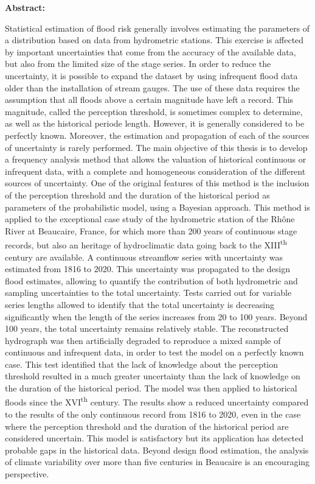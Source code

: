 \thispagestyle{empty}

\noindent \textbf{Abstract:}

\noindent \small{Statistical estimation of flood risk generally involves estimating the parameters of a distribution based on data from hydrometric stations. This exercise is affected by important uncertainties that come from the accuracy of the available data, but also from the limited size of the stage series. In order to reduce the uncertainty, it is possible to expand the dataset by using infrequent flood data older than the installation of stream gauges. The use of these data requires the assumption that all floods above a certain magnitude have left a record. This magnitude, called the perception threshold, is sometimes complex to determine, as well as the historical periode length. However, it is generally considered to be perfectly known. Moreover, the estimation and propagation of each of the sources of uncertainty is rarely performed. The main objective of this thesis is to develop a frequency analysis method that allows the valuation of historical continuous or infrequent data, with a complete and homogeneous consideration of the different sources of uncertainty. One of the original features of this method is the inclusion of the perception threshold and the duration of the historical period as parameters of the probabilistic model, using a Bayesian approach. This method is applied to the exceptional case study of the hydrometric station of the Rhône River at Beaucaire, France, for which more than 200 years of continuous stage records, but also an heritage of hydroclimatic data going back to the XIII\textsuperscript{th} century are available. A continuous streamflow series with uncertainty was estimated from 1816 to 2020. This uncertainty was propagated to the design flood estimates, allowing to quantify the contribution of both hydrometric and sampling uncertainties to the total uncertainty. Tests carried out for variable series lengths allowed to identify that the total uncertainty is decreasing significantly when the length of the series increases from 20 to 100 years. Beyond 100 years, the total uncertainty remains relatively stable. The reconstructed hydrograph was then artificially degraded to reproduce a mixed sample of continuous and infrequent data, in order to test the model on a perfectly known case. This test identified that the lack of knowledge about the perception threshold resulted in a much greater uncertainty than the lack of knowledge on the duration of the historical period. The model was then applied to historical floods since the XVI\textsuperscript{th} century. The results show a reduced uncertainty compared to the results of the only continuous record from 1816 to 2020, even in the case where the perception threshold and the duration of the historical period are considered uncertain. This model is satisfactory but its application has detected probable gaps in the historical data. Beyond design flood estimation, the analysis of climate variability over more than five centuries in Beaucaire is an encouraging perspective.}

